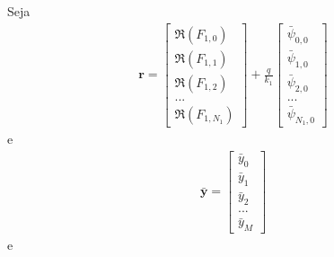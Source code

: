 Seja
\begin{align}
\mathbf{r} = \begin{bmatrix}
\scriptstyle\Re(F_{1,0}) \\ \scriptstyle\Re(F_{1,1}) \\ \scriptstyle\Re(F_{1,2}) \\ ... \\ \scriptstyle\Re(F_{1,N_1})
\end{bmatrix}
+
\frac{q}{k_1}\begin{bmatrix}
\scriptstyle\bar{\psi}_{0,0} \\ \scriptstyle\bar{\psi}_{1,0} \\ \scriptstyle\bar{\psi}_{2,0} \\ ... \\ \scriptstyle\bar{\psi}_{N_1,0}
\end{bmatrix}
\end{align}
e
\begin{align}
\mathbf{\bar{y}} = \begin{bmatrix}
\scriptstyle\bar{y}_0 \\ \scriptstyle\bar{y}_1 \\ \scriptstyle\bar{y}_2 \\ ... \\ \scriptstyle\bar{y}_M
\end{bmatrix}
\end{align}
e
